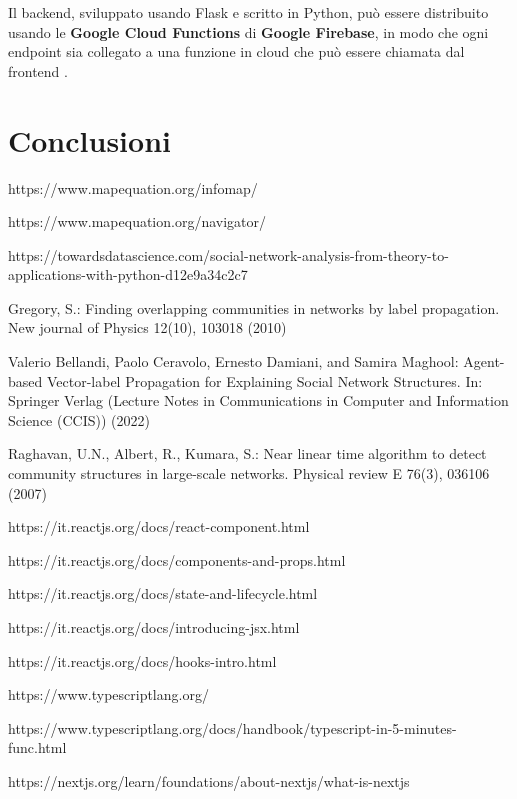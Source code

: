 \documentclass[a4paper,12pt]{report}
\begin{document}
	Il backend, sviluppato usando Flask e scritto in Python, può essere distribuito usando le \textbf{Google Cloud Functions} di \textbf{Google Firebase}, in modo che ogni endpoint sia collegato a una funzione in cloud che può essere chiamata dal frontend \cite{googlecloudfunctions}.

\chapter{Conclusioni}

%
%
\begin{thebibliography}{0}
%
https://www.mapequation.org/infomap/

https://www.mapequation.org/navigator/

https://towardsdatascience.com/social-network-analysis-from-theory-to-applications-with-python-d12e9a34c2c7

Gregory, S.: Finding overlapping communities in networks by label propagation.
New journal of Physics 12(10), 103018 (2010)

Valerio Bellandi, Paolo Ceravolo, Ernesto Damiani, and Samira Maghool: Agent-based Vector-label Propagation for Explaining Social Network Structures. In: Springer Verlag (Lecture Notes in Communications in Computer and Information Science (CCIS)) (2022)

Raghavan, U.N., Albert, R., Kumara, S.: Near linear time algorithm to detect
community structures in large-scale networks. Physical review E 76(3), 036106
(2007)

https://it.reactjs.org/docs/react-component.html

https://it.reactjs.org/docs/components-and-props.html

https://it.reactjs.org/docs/state-and-lifecycle.html

https://it.reactjs.org/docs/introducing-jsx.html

https://it.reactjs.org/docs/hooks-intro.html

https://www.typescriptlang.org/

https://www.typescriptlang.org/docs/handbook/typescript-in-5-minutes-func.html

https://nextjs.org/learn/foundations/about-nextjs/what-is-nextjs


\end{thebibliography}
\end{document}
